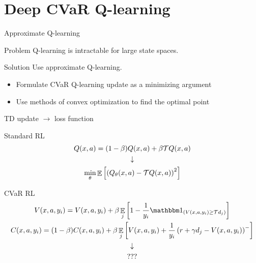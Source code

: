 \documentclass{beamer}
\begin{document}

\section{Deep CVaR Q-learning}



\begin{frame}{Approximate Q-learning}
\begin{alertblock}
{Problem} Q-learning is intractable for large state spaces.
\end{alertblock}
\begin{exampleblock}
{Solution} Use approximate Q-learning.
\end{exampleblock}

\begin{itemize}
\item Formulate CVaR Q-learning update as a minimizing argument
\item Use methods of convex optimization to find the optimal point
\end{itemize}
\end{frame}


\begin{frame}{TD update $\to$ loss function}

\begin{block}{Standard RL}\small\vspace{-0.3cm}
\begin{gather*}
Q(x, a) = (1-\beta)Q(x, a) + \beta \mathcal{T} Q(x, a)\\
\downarrow\\
\min_\theta \mathop{\mathbb{E}} \left[\left( {Q_\theta(x, a) - \mathcal{T} Q(x, a)} \right)^2\right]
\end{gather*}
\end{block}
\begin{block}{CVaR RL}\small\vspace{-0.3cm}
\begin{gather*}
V(x, a, y_i) = V(x, a, y_i) + \beta \expect_j\bsquare{1 - \frac{1}{y_i}\indicator_{(V(x, a, y_i) \ge \cT d_j)}}\\
C(x, a, y_i) = (1-\beta)C(x, a, y_i) + \beta\expect_j\bsquare{V(x, a, y_i) + \frac{1}{y_i}\bround{r+\gamma d_j - V(x, a, y_i)}^-}\\
\downarrow\\
???
\end{gather*}
\end{block}

\end{frame}
\end{document}
